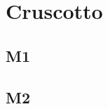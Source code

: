 \documentclass[a4paper,12pt]{article}
\begin{document}
        


    \section{Cruscotto}
        \subsection{M1}

        \subsection{M2}
\end{document}
